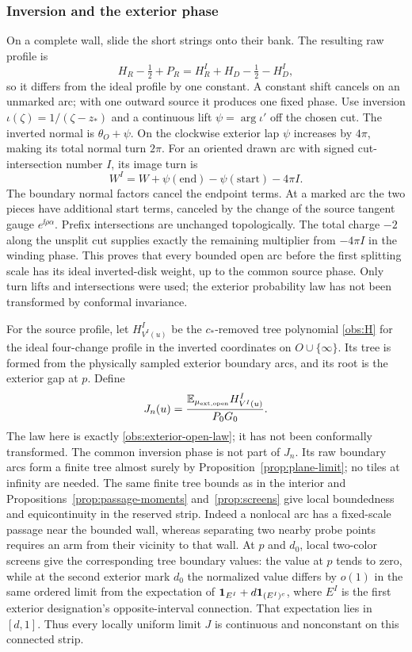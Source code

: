 \subsubsection{Inversion and the exterior phase}
On a complete wall, slide the short strings onto their bank.  The
resulting raw profile is
\[
 H_R-\tfrac12+P_R=H_R^I+H_D-\tfrac12-H_D^I,
\]
so it differs from the ideal profile by one constant.  A constant
shift cancels on an unmarked arc; with one outward source it produces
one fixed phase.  Use inversion $\iota(\zeta)=1/(\zeta-z_*)$ and a
continuous lift
$\psi=\arg\iota'$ off the chosen cut.  The inverted normal is
$\theta_O+\psi$.  On the clockwise exterior lap $\psi$ increases by
$4\pi$, making its total normal turn $2\pi$.  For an oriented
drawn arc with signed cut-intersection number $I$, its image turn is
\begin{equation}
 W^I=W+\psi(\mathrm{end})-\psi(\mathrm{start})-4\pi I.
 \label{obs:inversion-turn}
\end{equation}
The boundary normal factors cancel the endpoint terms.  At a marked
arc the two pieces have additional start terms, canceled by the
change of the source tangent gauge $e^{\ii\rho\alpha}$.
Prefix intersections are unchanged topologically.  The total
charge $-2$ along the unsplit cut supplies exactly the remaining
multiplier from $-4\pi I$ in the winding phase.  This proves that
every bounded open arc before the first splitting scale has its
ideal inverted-disk weight, up to the common source phase.  Only
turn lifts and intersections were used; the exterior probability
law has not been transformed by conformal invariance.

For the source profile, let $H^I_{V^I(u)}$ be the $c_*$-removed
tree polynomial \eqref{obs:H} for the ideal four-change profile in
the inverted coordinates on $O\cup\{\infty\}$.  Its tree is formed
from the physically sampled exterior boundary arcs, and its root
is the exterior gap at $p$.  Define
\begin{equation}
 J_n(u)=
 \frac{\mathbb E_{\mu_{\rm ext,open}}H^I_{V^I(u)}}{P_0G_0}.
 \label{obs:exterior-observable}
\end{equation}
The law here is exactly \eqref{obs:exterior-open-law}; it has not
been conformally transformed.  The common inversion phase is not
part of $J_n$.  Its raw boundary arcs form a finite tree almost
surely by Proposition~\ref{prop:plane-limit}; no tiles at infinity
are needed.  The same finite tree bounds as in the interior and
Propositions~\ref{prop:passage-moments} and~\ref{prop:screens}
give local boundedness and equicontinuity in the reserved strip.
Indeed a nonlocal arc has a fixed-scale passage near the bounded
wall, whereas separating two nearby probe points requires an arm
from their vicinity to that wall.  At $p$ and $d_0$, local two-color
screens give the corresponding tree boundary values: the value at
$p$ tends to zero, while at the second exterior mark $d_0$ the
normalized value differs by $o(1)$ in the same ordered limit from
the expectation of
$\mathbf 1_{E^I}+d\mathbf 1_{(E^I)^c}$, where $E^I$ is the first exterior
designation's opposite-interval connection.  That expectation lies
in $[d,1]$.
Thus every locally uniform limit $J$ is continuous and
nonconstant on this connected strip.


